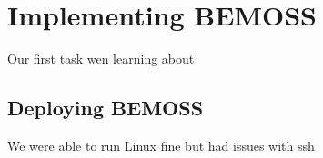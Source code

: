 
\chapter{Implementing BEMOSS}
Our first task wen learning about 

\section{Deploying BEMOSS}
We were able to run Linux fine but had issues with ssh
